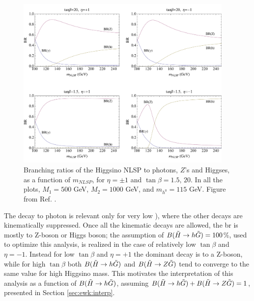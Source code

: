 \begin{figure}[h]
	\centering
	\includegraphics[width=0.95\textwidth]{figures/ewk_prod/varie/BRfracs}
\caption{Branching ratios of the Higgsino NLSP to photons, $Z$'s and Higgses, as a function of $m_{NLSP}$, for $\eta=\pm1$ and $\tan\beta=1.5,\,20$. In all the plots, $M_1=500$ GeV, $M_2=1000$ GeV, and $m_{h^0}=115$ GeV. Figure from Ref. \cite{Meade:2009qv}.}
\label{fig:HiggsinoBR}
\end{figure}

The decay to photon is relevant only for very low \mhino), where the other decays are kinematically suppressed. 
Once all the kinematic decays are allowed, the \gls{br} is mostly to Z-boson or Higgs boson; 
the assumption of $B(\tilde{H}\rightarrow h \tilde{G}) = 100$\%, used to optimize this analysis, is 
realized in the case of relatively low $\tan \beta$ and $\eta = -1$.
Instead for low $\tan \beta$ and $\eta = +1$ the dominant decay is to a Z-boson, while for high 
$\tan \beta$ both $B(\tilde{H}\rightarrow h \tilde{G})$ and $B(\tilde{H}\rightarrow Z \tilde{G})$ tend to 
converge to the same value for high Higgsino mass.
This motivates the interpretation of this analysis as a function of $B(\tilde{H}\rightarrow h \tilde{G})$, 
assuming $B(\tilde{H}\rightarrow h \tilde{G}) +B(\tilde{H}\rightarrow Z \tilde{G}) =1$, presented in Section \ref{sec:ewk:interp}.




